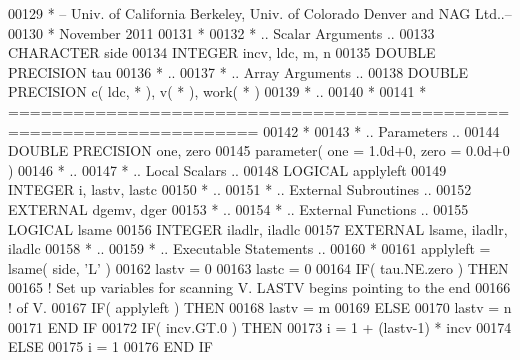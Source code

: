 \begin{DoxyCode}
00129 \textcolor{comment}{*  -- Univ. of California Berkeley, Univ. of Colorado Denver and NAG Ltd..--}
00130 \textcolor{comment}{*     November 2011}
00131 \textcolor{comment}{*}
00132 \textcolor{comment}{*     .. Scalar Arguments ..}
00133       \textcolor{keywordtype}{CHARACTER}          side
00134       \textcolor{keywordtype}{INTEGER}            incv, ldc, m, n
00135       \textcolor{keywordtype}{DOUBLE PRECISION}   tau
00136 \textcolor{comment}{*     ..}
00137 \textcolor{comment}{*     .. Array Arguments ..}
00138       \textcolor{keywordtype}{DOUBLE PRECISION}   c( ldc, * ), v( * ), work( * )
00139 \textcolor{comment}{*     ..}
00140 \textcolor{comment}{*}
00141 \textcolor{comment}{*  =====================================================================}
00142 \textcolor{comment}{*}
00143 \textcolor{comment}{*     .. Parameters ..}
00144       \textcolor{keywordtype}{DOUBLE PRECISION}   one, zero
00145       parameter( one = 1.0d+0, zero = 0.0d+0 )
00146 \textcolor{comment}{*     ..}
00147 \textcolor{comment}{*     .. Local Scalars ..}
00148       \textcolor{keywordtype}{LOGICAL}            applyleft
00149       \textcolor{keywordtype}{INTEGER}            i, lastv, lastc
00150 \textcolor{comment}{*     ..}
00151 \textcolor{comment}{*     .. External Subroutines ..}
00152       \textcolor{keywordtype}{EXTERNAL}           dgemv, dger
00153 \textcolor{comment}{*     ..}
00154 \textcolor{comment}{*     .. External Functions ..}
00155       \textcolor{keywordtype}{LOGICAL}            lsame
00156       \textcolor{keywordtype}{INTEGER}            iladlr, iladlc
00157       \textcolor{keywordtype}{EXTERNAL}           lsame, iladlr, iladlc
00158 \textcolor{comment}{*     ..}
00159 \textcolor{comment}{*     .. Executable Statements ..}
00160 \textcolor{comment}{*}
00161       applyleft = lsame( side, \textcolor{stringliteral}{'L'} )
00162       lastv = 0
00163       lastc = 0
00164       \textcolor{keywordflow}{IF}( tau.NE.zero ) \textcolor{keywordflow}{THEN}
00165 \textcolor{comment}{!     Set up variables for scanning V.  LASTV begins pointing to the end}
00166 \textcolor{comment}{!     of V.}
00167          \textcolor{keywordflow}{IF}( applyleft ) \textcolor{keywordflow}{THEN}
00168             lastv = m
00169          \textcolor{keywordflow}{ELSE}
00170             lastv = n
00171 \textcolor{keywordflow}{         END IF}
00172          \textcolor{keywordflow}{IF}( incv.GT.0 ) \textcolor{keywordflow}{THEN}
00173             i = 1 + (lastv-1) * incv
00174          \textcolor{keywordflow}{ELSE}
00175             i = 1
00176 \textcolor{keywordflow}{         END IF}

\end{DoxyCode}
